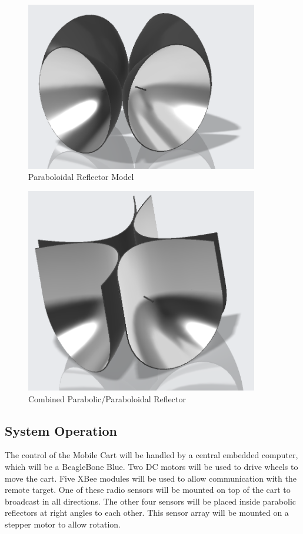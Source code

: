 \documentclass[letterpaper,12pt]{article}   %
\begin{document}
\begin{figure}[h!]
  \centering
  \includegraphics[width=4in]{figs/img/paraboloidalReflector}
  \caption{Paraboloidal Reflector Model}
  \label{fig:parabolodialReflector}
\end{figure}

\begin{figure}[h!]
  \centering
  \includegraphics[width=4in]{figs/img/parabolicReflector}
  \caption{Combined Parabolic/Paraboloidal Reflector}
  \label{fig:parabolicReflector}
\end{figure}

\subsection{System Operation}
The control of the Mobile Cart will be handled by a central embedded computer, which will be a BeagleBone Blue. Two DC motors will be used to drive wheels to move the cart. Five XBee modules will be used to allow communication with the remote target. One of these radio sensors will be mounted on top of the cart to broadcast in all directions. The other four sensors will be placed inside parabolic reflectors at right angles to each other. This sensor array will be mounted on a stepper motor to allow rotation. 
\end{document}
